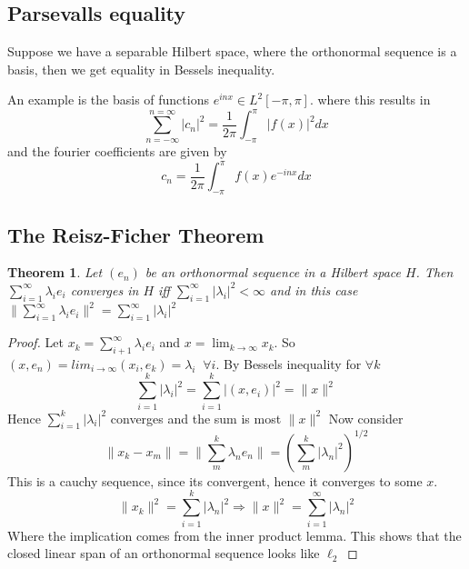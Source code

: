 \documentclass[titlepage]{article}
\newtheorem{thm}{Theorem}[section]
\begin{document}
\subsection{Parsevalls equality}
Suppose we have a separable Hilbert space, where the orthonormal sequence is a basis, then we get equality in Bessels inequality.

An example is the  basis of functions $e^{inx} \in L^2[-\pi,\pi]$.
where this results in 
\begin{equation}
\sum_{n = -\infty}^{n = \infty} |c_n|^2 = \frac{1}{2\pi} \int_{-\pi}^{\pi}|f(x)|^2 dx
\end{equation}
and the fourier coefficients are given by
\begin{equation}
c_n = \frac{1}{2\pi}\int_{-\pi}^\pi f(x)e^{-inx} dx
\end{equation}
\subsection{The Reisz-Ficher Theorem}
\begin{thm}
Let $(e_n)$ be an orthonormal sequence in a Hilbert space $H$. Then $\sum_{i = 1}^{\infty}\lambda_ie_i $ converges in $H$ iff $\sum_{i = 1}^{\infty} |\lambda_i|^2 < \infty$ and in this case $\|\sum_{i = 1}^{\infty} \lambda_ie_i\|^2 = \sum_{i = 1}^{\infty} |\lambda_i|^2   $
\end{thm}
\begin{proof}
Let $x_k = \sum_{i+1}^\infty \lambda_i e_i$ and $x = \lim_{k \rightarrow \infty} x_k$. So $(x,e_n) = lim_{i \rightarrow \infty} (x_i,e_k) = \lambda_i \;\; \forall i$. By Bessels inequality for $\forall k$
\begin{equation}
\sum_{i = 1}^k |\lambda_i| ^2 = \sum_{i = 1}^k |(x,e_i)| ^2 = \| x \| ^2
\end{equation}
Hence $\sum_{i = 1}^k |\lambda_i| ^2$ converges and the sum is most $\|x\|^2$
Now consider
\begin{equation}
\|x_k - x_m\| = \|\sum_m^k \lambda_ne_n\| = \left(\sum_m^k |\lambda_n|^2 \right)^{1/2}
\end{equation}
 This is a cauchy sequence, since its convergent, hence it converges to some $x$. 
 \begin{equation}
 \|x_k \|^2 = \sum_{i = 1} ^k |\lambda_n |^2 \Longrightarrow \|x\|^2 = \sum_{i = 1} ^\infty |\lambda_n |^2
 \end{equation}
Where the implication comes from the inner product lemma.
This shows that the closed linear span of an orthonormal sequence looks like 
$\ell_2$
\end{proof}
\end{document}
